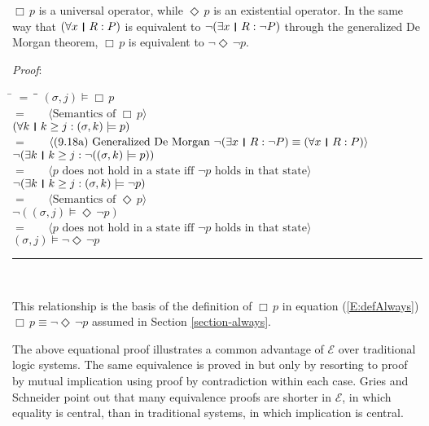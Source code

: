 \documentclass[12pt, fleqn, leqno]{article}
\newcommand{\lgap}{2pt}                             %
\newcommand{\mymathindent}{24pt}                    %
\newcommand{\Event}{\Diamond\,}
\newcommand{\Always}{\Box\,}
\newcommand{\myqed}{\rule[-.23ex]{1.2ex}{2.0ex}}
\newcommand{\myqedtab}{\hspace{384pt}}              %
\newcommand{\thedr}{\rule[-.25ex]{.32mm}{1.75ex}}   %
\newcommand{\dr}{\;\,\thedr\,\;}                    %
\newcommand{\rb}{:}                                 %
\newcommand{\all}{\forall}                          %
\newcommand{\ext}{\exists}                          %
\newcommand{\Gll} {\langle}                         %
\newcommand{\Ggg} {\rangle}                         %
\newcommand{\Hint}[1]     {\ \ \ $\Gll              \mbox{#1} \Ggg$ }   %
\begin{document}
$\Always p$ is a universal operator, while $\Event p$ is an existential operator.
In the same way that $(\all x\dr R\rb P)$ is equivalent to $\neg (\ext x\dr R\rb \neg P)$ through the generalized De Morgan theorem, $\Always p$ is equivalent to $\neg\Event\neg p$.

\emph{Proof}:
\begin{tabbing}
\hspace{\mymathindent} \= $= \;$ \= \myqedtab \= \kill
	\> \>   $(\sigma, j) \models \Always p$\\[\lgap]
	\> $=$  \>  \Hint{Semantics of $\Always p$}\\[\lgap]
	\> \>   $(\all k \dr k \ge j \rb (\sigma,k) \models p)$\\[\lgap]
	\> $=$  \>  \Hint{(9.18a) Generalized De Morgan $\neg (\ext x\dr R\rb \neg P)\equiv (\all x\dr R\rb P)$}\\[\lgap]
	\> \>   $\neg (\ext k \dr k \ge j \rb \neg((\sigma,k) \models p))$\\[\lgap]
	\> $=$  \>  \Hint{$p$ does not hold in a state iff $\neg p$ holds in that state}\\[\lgap]
	\> \>   $\neg (\ext k \dr k \ge j \rb (\sigma,k) \models \neg p)$\\[\lgap]
	\> $=$  \>  \Hint{Semantics of $\Event p$}\\[\lgap]
	\> \>   $\neg ((\sigma, j) \models \Event \neg p)$\\[\lgap]
	\> $=$  \>  \Hint{$p$ does not hold in a state iff $\neg p$ holds in that state}\\[\lgap]
	\> \>   $(\sigma, j) \models \neg \Event \neg p$ \quad \myqed\\
\end{tabbing}
This relationship is the basis of the definition of $\Always p$ in equation (\ref{E:defAlways})
$\Always p \equiv \neg\Event\neg p$ assumed in Section \ref{section-always}.

The above equational proof illustrates a common advantage of $\mathcal{E}$ over traditional logic systems.
The same equivalence is proved in \cite{Ben} but only by resorting to proof by mutual implication using proof by contradiction within each case.
Gries and Schneider \cite{LADM} point out that many equivalence proofs are shorter in $\mathcal{E}$, in which equality is central, than in traditional systems, in which implication is central.
\end{document}
